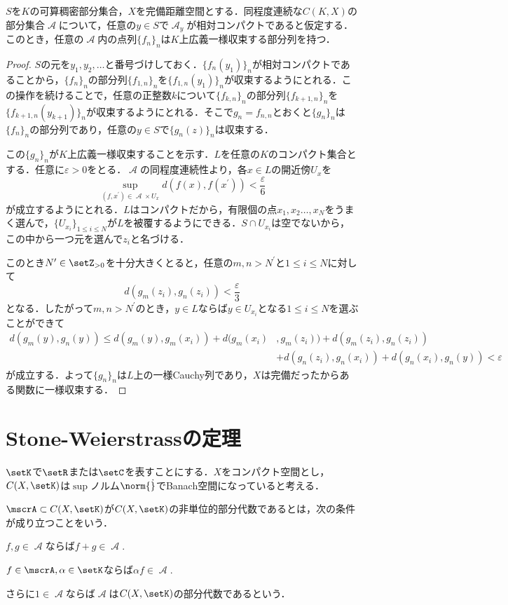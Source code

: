 \documentclass[uplatex]{jsarticle}
\begin{document}
\begin{theorem}
$S$を$K$の可算稠密部分集合，$X$を完備距離空間とする．同程度連続な$C(K,X)$の部分集合$\mscrA$について，任意の$y\in S$で$\mscrA_{y}$が相対コンパクトであると仮定する．このとき，任意の$\mscrA$内の点列$\{f_n\}_n$は$K$上広義一様収束する部分列を持つ．
\end{theorem}
\begin{proof}
$S$の元を$y_1,y_2,\dots$と番号づけしておく．$\{f_n(y_1)\}_n$が相対コンパクトであることから，$\{f_n\}_n$の部分列$\{f_{1,n}\}_n$を$\{f_{1,n}(y_1)\}_n$が収束するようにとれる．この操作を続けることで，任意の正整数$k$について$\{f_{k,n}\}_n$の部分列$\{f_{k+1,n}\}_n$を$\{f_{k+1,n}(y_{k+1})\}_n$が収束するようにとれる．そこで$g_n=f_{n,n}$とおくと$\{g_n\}_n$は$\{f_n\}_n$の部分列であり，任意の$y\in S$で$\{g_n(z)\}_n$は収束する．

この$\{g_n\}_n$が$K$上広義一様収束することを示す．$L$を任意の$K$のコンパクト集合とする．任意に$\varepsilon>0$をとる．$\mscrA$の同程度連続性より，各$x\in L$の開近傍$U_x$を
\[ \sup_{(f,x^\prime)\in \mscrA\times U_x} d(f(x),f(x^\prime)) < \frac{\varepsilon}{6} \]
が成立するようにとれる．$L$はコンパクトだから，有限個の点$x_1,x_2\dots,x_N$をうまく選んで，$\{U_{x_i}\}_{1\leq i\leq N}$が$L$を被覆するようにできる．$S\cap U_{x_i}$は空でないから，この中から一つ元を選んで$z_i$と名づける．

このとき$N^\prime\in \setZ_{>0}$を十分大きくとると，任意の$m,n>N^\prime$と$1\leq i\leq N$に対して
\[ d(g_m(z_i),g_n(z_i)) < \frac{\varepsilon}{3} \]
となる．したがって$m,n>N^\prime$のとき，$y\in L$ならば$y\in U_{x_i}$となる$1\leq i \leq N$を選ぶことができて
\begin{align*}
    d(g_m(y),g_n(y)) \leq d(g_m(y),g_m(x_i)) + d(g_m(x_i)&,g_m(z_i))+ d(g_m(z_i),g_n(z_i)) \\
    &+ d(g_n(z_i),g_n(x_i)) + d(g_n(x_i),g_n(y)) < \varepsilon
\end{align*}
が成立する．よって$\{g_n\}_n$は$L$上の一様Cauchy列であり，$X$は完備だったからある関数に一様収束する．
\end{proof}

\section{Stone-Weierstrassの定理}
$\setK$で$\setR$または$\setC$を表すことにする．$X$をコンパクト空間とし，$C(X,\setK)$は$\sup$ノルム$\norm{\dot}$でBanach空間になっていると考える．

\begin{definition}
$\mscrA\subset C(X,\setK)$が$C(X,\setK)$の非単位的部分代数であるとは，次の条件が成り立つことをいう．
\begin{enumarabicp}
\item $f,g\in \mscrA$ならば$f+g\in \mscrA.$
\item $f\in \mscrA,\alpha\in \setK$ならば$\alpha f\in \mscrA.$
\end{enumarabicp}
さらに$1\in \mscrA$ならば$\mscrA$は$C(X,\setK)$の部分代数であるという．
\end{definition}
\end{document}
